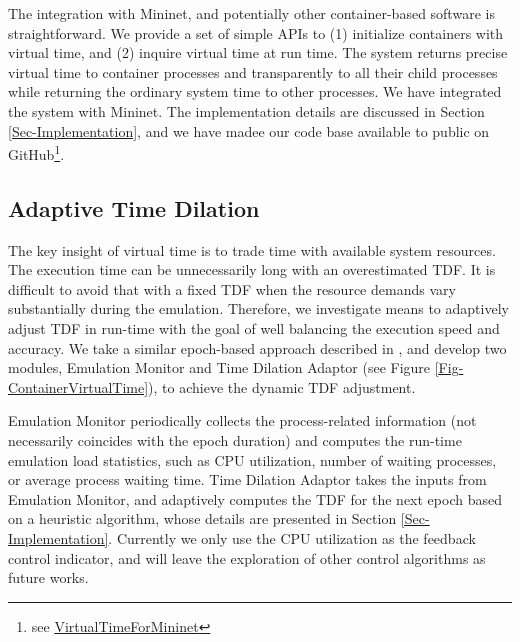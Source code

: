 The integration with Mininet, and potentially other container-based software is straightforward. 
We provide a set of simple APIs to (1) initialize containers with virtual time, and (2) inquire virtual time at run time. 
The system returns precise virtual time to container processes and transparently to all their child processes while returning the ordinary system time to other processes. 
We have integrated the system with Mininet. The implementation details are discussed in Section \ref{Sec-Implementation}, and we have madee our code base available to public on GitHub\footnote{see \href{https://github.com/littlepretty/VirtualTimeForMininet}{VirtualTimeForMininet}}. 

\subsection{Adaptive Time Dilation}

The key insight of virtual time is to trade time with available system resources. The execution time can be unnecessarily long with an overestimated TDF. 
It is difficult to avoid that with a fixed TDF when the resource demands vary substantially during the emulation. 
Therefore, we investigate means to adaptively adjust TDF in run-time with the goal of well balancing the execution speed and accuracy. 
We take a similar epoch-based approach described in \cite{NtwkEmultAdaptVirtTime}, and develop two modules, Emulation Monitor and Time Dilation Adaptor (see Figure \ref{Fig-ContainerVirtualTime}), to achieve the dynamic TDF adjustment. 

Emulation Monitor periodically collects the process-related information (not necessarily coincides with the epoch duration) and computes the run-time emulation load statistics, such as CPU utilization, number of waiting processes, or average process waiting time. 
Time Dilation Adaptor takes the inputs from Emulation Monitor, and adaptively computes the TDF for the next epoch based on a heuristic algorithm, whose details are presented in Section \ref{Sec-Implementation}. 
Currently we only use the CPU utilization as the feedback control indicator, and will leave the exploration of other control algorithms as future works. 


